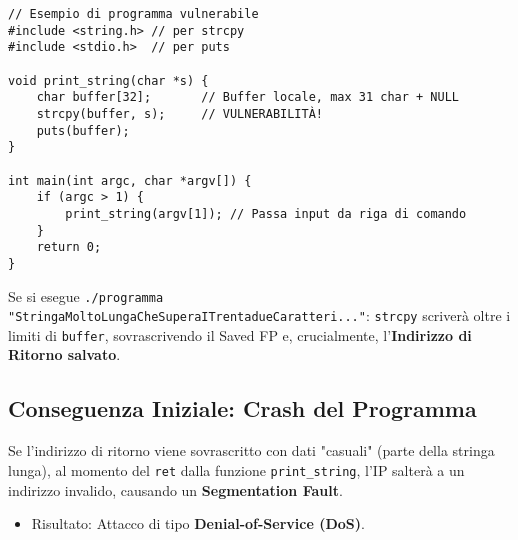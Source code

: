\documentclass{article}
\begin{document}
\begin{verbatim}
// Esempio di programma vulnerabile
#include <string.h> // per strcpy
#include <stdio.h>  // per puts

void print_string(char *s) {
    char buffer[32];       // Buffer locale, max 31 char + NULL
    strcpy(buffer, s);     // VULNERABILITÀ!
    puts(buffer);
}

int main(int argc, char *argv[]) {
    if (argc > 1) {
        print_string(argv[1]); // Passa input da riga di comando
    }
    return 0;
}
\end{verbatim}
Se si esegue \texttt{./programma "StringaMoltoLungaCheSuperaITrentadueCaratteri..."}:
\texttt{strcpy} scriverà oltre i limiti di \texttt{buffer}, sovrascrivendo il Saved FP e, crucialmente, l'\textbf{Indirizzo di Ritorno salvato}.

\subsection{Conseguenza Iniziale: Crash del Programma}
Se l'indirizzo di ritorno viene sovrascritto con dati "casuali" (parte della stringa lunga), al momento del \texttt{ret} dalla funzione \texttt{print\_string}, l'IP salterà a un indirizzo invalido, causando un \textbf{Segmentation Fault}.
\begin{itemize}
    \item Risultato: Attacco di tipo \textbf{Denial-of-Service (DoS)}.
\end{itemize}
\end{document}
